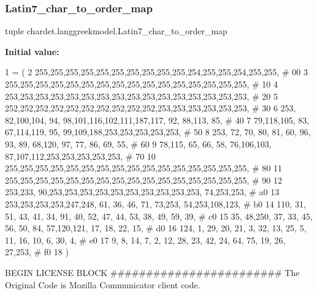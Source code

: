 \mbox{\label{namespacechardet_1_1langgreekmodel_adbbf878802f9d7b481a6e8ffdddbdac8}} 
\subsubsection{\texorpdfstring{Latin7\+\_\+char\+\_\+to\+\_\+order\+\_\+map}{Latin7\_char\_to\_order\_map}}
{\footnotesize\ttfamily tuple chardet.\+langgreekmodel.\+Latin7\+\_\+char\+\_\+to\+\_\+order\+\_\+map}

{\bfseries Initial value\+:}
\begin{DoxyCode}
1 =  (
2 255,255,255,255,255,255,255,255,255,255,254,255,255,254,255,255,  \textcolor{comment}{# 00}
3 255,255,255,255,255,255,255,255,255,255,255,255,255,255,255,255,  \textcolor{comment}{# 10}
4 253,253,253,253,253,253,253,253,253,253,253,253,253,253,253,253,  \textcolor{comment}{# 20}
5 252,252,252,252,252,252,252,252,252,252,253,253,253,253,253,253,  \textcolor{comment}{# 30}
6 253, 82,100,104, 94, 98,101,116,102,111,187,117, 92, 88,113, 85,  \textcolor{comment}{# 40}
7  79,118,105, 83, 67,114,119, 95, 99,109,188,253,253,253,253,253,  \textcolor{comment}{# 50}
8 253, 72, 70, 80, 81, 60, 96, 93, 89, 68,120, 97, 77, 86, 69, 55,  \textcolor{comment}{# 60}
9  78,115, 65, 66, 58, 76,106,103, 87,107,112,253,253,253,253,253,  \textcolor{comment}{# 70}
10 255,255,255,255,255,255,255,255,255,255,255,255,255,255,255,255,  \textcolor{comment}{# 80}
11 255,255,255,255,255,255,255,255,255,255,255,255,255,255,255,255,  \textcolor{comment}{# 90}
12 253,233, 90,253,253,253,253,253,253,253,253,253,253, 74,253,253,  \textcolor{comment}{# a0}
13 253,253,253,253,247,248, 61, 36, 46, 71, 73,253, 54,253,108,123,  \textcolor{comment}{# b0}
14 110, 31, 51, 43, 41, 34, 91, 40, 52, 47, 44, 53, 38, 49, 59, 39,  \textcolor{comment}{# c0}
15  35, 48,250, 37, 33, 45, 56, 50, 84, 57,120,121, 17, 18, 22, 15,  \textcolor{comment}{# d0}
16 124,  1, 29, 20, 21,  3, 32, 13, 25,  5, 11, 16, 10,  6, 30,  4,  \textcolor{comment}{# e0}
17   9,  8, 14,  7,  2, 12, 28, 23, 42, 24, 64, 75, 19, 26, 27,253,  \textcolor{comment}{# f0}
18 )
\end{DoxyCode}


B\+E\+G\+IN L\+I\+C\+E\+N\+SE B\+L\+O\+CK \#\#\#\#\#\#\#\#\#\#\#\#\#\#\#\#\#\#\#\#\#\#\#\# The Original Code is Mozilla Communicator client code. 


